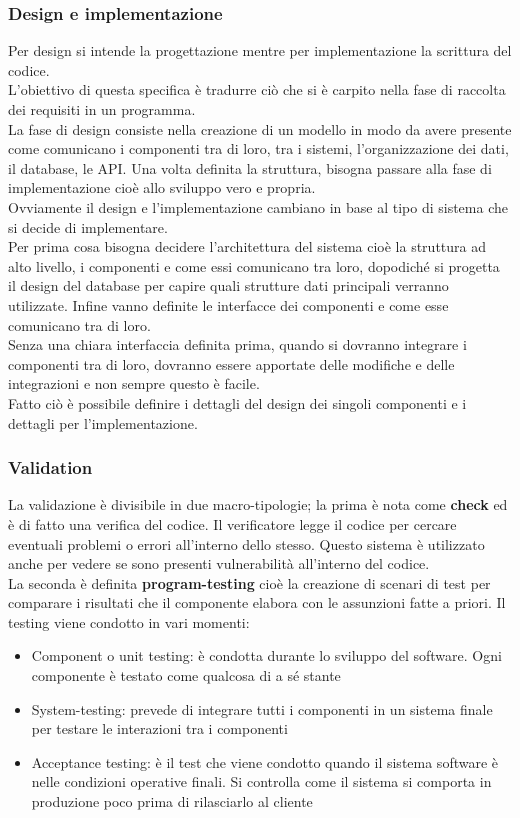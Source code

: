 \subsubsection{Design e implementazione}
Per design si intende la progettazione mentre per implementazione la scrittura del codice.\\
L'obiettivo di questa specifica è tradurre ciò che si è carpito nella fase di raccolta dei requisiti in un programma.\\
La fase di design consiste nella creazione di un modello in modo da avere presente come comunicano i componenti tra di loro, tra i sistemi, l'organizzazione dei dati, il database, le API.
Una volta definita la struttura, bisogna passare alla fase di implementazione cioè allo sviluppo vero e propria.\\
Ovviamente il design e l'implementazione cambiano in base al tipo di sistema che si decide di implementare.\\
Per prima cosa bisogna decidere l'architettura del sistema cioè la struttura ad alto livello, i componenti e come essi comunicano tra loro, dopodiché si progetta il design del database per capire quali strutture dati principali verranno utilizzate.
Infine vanno definite le interfacce dei componenti e come esse comunicano tra di loro.\\
Senza una chiara interfaccia definita prima, quando si dovranno integrare i componenti tra di loro, dovranno essere apportate delle modifiche e delle integrazioni e non sempre questo è facile.\\
Fatto ciò è possibile definire i dettagli del design dei singoli componenti e i dettagli per l'implementazione.

\subsubsection{Validation}
La validazione è divisibile in due macro-tipologie; la prima è nota come \textbf{check} ed è di fatto una verifica del codice.
Il verificatore legge il codice per cercare eventuali problemi o errori all'interno dello stesso.
Questo sistema è utilizzato anche per vedere se sono presenti vulnerabilità all'interno del codice.\\
La seconda è definita \textbf{program-testing} cioè la creazione di scenari di test per comparare i risultati che il componente elabora con le assunzioni fatte a priori.
Il testing viene condotto in vari momenti:
\begin{itemize}
    \item Component o unit testing: è condotta durante lo sviluppo del software. Ogni componente è testato come qualcosa di a sé stante
    \item System-testing: prevede di integrare tutti i componenti in un sistema finale per testare le interazioni tra i componenti
    \item Acceptance testing: è il test che viene condotto quando il sistema software è nelle condizioni operative finali. Si controlla come il sistema si comporta in produzione poco prima di rilasciarlo al cliente
\end{itemize}

